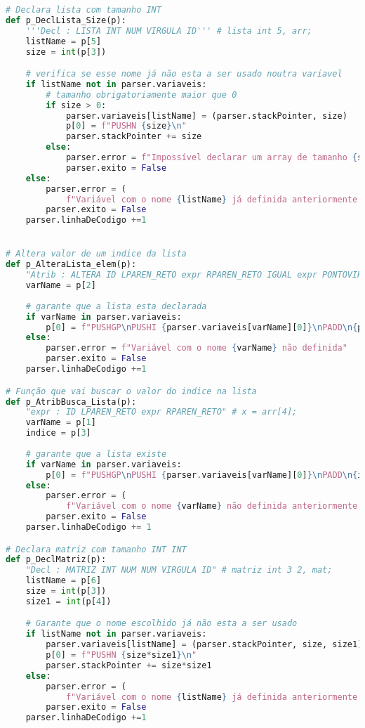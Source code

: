 \documentclass[11pt,a4paper]{report}
\begin{document}
\begin{scriptsize}
\begin{lstlisting}[language=python]
# Declara lista com tamanho INT
def p_DeclLista_Size(p):
    '''Decl : LISTA INT NUM VIRGULA ID''' # lista int 5, arr;
    listName = p[5]
    size = int(p[3])

    # verifica se esse nome já não esta a ser usado noutra variavel
    if listName not in parser.variaveis:
        # tamanho obrigatoriamente maior que 0
        if size > 0:
            parser.variaveis[listName] = (parser.stackPointer, size)
            p[0] = f"PUSHN {size}\n"
            parser.stackPointer += size
        else:
            parser.error = f"Impossível declarar um array de tamanho {size}"
            parser.exito = False
    else:
        parser.error = (
            f"Variável com o nome {listName} já definida anteriormente.")
        parser.exito = False
    parser.linhaDeCodigo +=1


# Altera valor de um indice da lista
def p_AlteraLista_elem(p):
    "Atrib : ALTERA ID LPAREN_RETO expr RPAREN_RETO IGUAL expr PONTOVIRGULA" # altera arr[3] = 4;
    varName = p[2]
    
    # garante que a lista esta declarada
    if varName in parser.variaveis:
        p[0] = f"PUSHGP\nPUSHI {parser.variaveis[varName][0]}\nPADD\n{p[4]}{p[7]}STOREN\n"
    else:
        parser.error = f"Variável com o nome {varName} não definida"
        parser.exito = False
    parser.linhaDeCodigo +=1

# Função que vai buscar o valor do indice na lista
def p_AtribBusca_Lista(p):
    "expr : ID LPAREN_RETO expr RPAREN_RETO" # x = arr[4];
    varName = p[1]
    indice = p[3]
    
    # garante que a lista existe
    if varName in parser.variaveis:
        p[0] = f"PUSHGP\nPUSHI {parser.variaveis[varName][0]}\nPADD\n{indice}LOADN\n"
    else:
        parser.error = (
            f"Variável com o nome {varName} não definida anteriormente.")
        parser.exito = False
    parser.linhaDeCodigo += 1

# Declara matriz com tamanho INT INT
def p_DeclMatriz(p):
    "Decl : MATRIZ INT NUM NUM VIRGULA ID" # matriz int 3 2, mat;
    listName = p[6]
    size = int(p[3])
    size1 = int(p[4])

    # Garante que o nome escolhido já não esta a ser usado
    if listName not in parser.variaveis:
        parser.variaveis[listName] = (parser.stackPointer, size, size1)
        p[0] = f"PUSHN {size*size1}\n"
        parser.stackPointer += size*size1
    else:
        parser.error = (
            f"Variável com o nome {listName} já definida anteriormente.")
        parser.exito = False
    parser.linhaDeCodigo +=1


\end{lstlisting}
\end{scriptsize}
\end{document}
